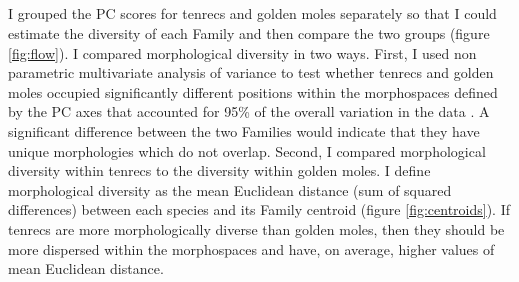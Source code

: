 \subsection{}
	
	I grouped the PC scores for tenrecs and golden moles separately so that I could estimate the diversity of each Family and then compare the two groups (figure \ref{fig:flow}). I compared morphological diversity in two ways. First, I used non parametric multivariate analysis of variance \citep[npMANOVA,][]{Anderson2001} to test whether tenrecs and golden moles occupied significantly different positions within the morphospaces defined by the PC axes that accounted for 95\% of the overall variation in the data \citep[e.g.][]{Serb2011, Ruta2013}. A significant difference between the two Families would indicate that they have unique morphologies which do not overlap. Second, I compared morphological diversity within tenrecs to the diversity within golden moles. I define morphological diversity as the mean Euclidean distance (sum of squared differences) between each species and its Family centroid (figure \ref{fig:centroids}). If tenrecs are more morphologically diverse than golden moles, then they should be more dispersed within the morphospaces and have, on average, higher values of mean Euclidean distance. 


